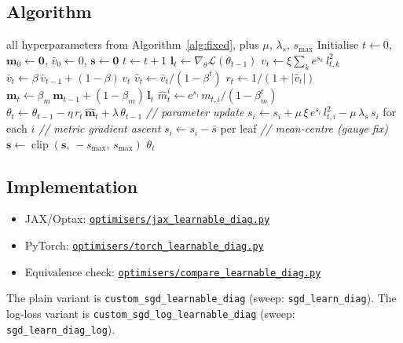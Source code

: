 \documentclass{article}
\newcommand{\loss}{\mathcal{L}}
\newcommand{\vecb}[1]{\boldsymbol{#1}}
\begin{document}
\subsection{Algorithm}

\begin{algorithm}[H]
\caption{Learnable diagonal metric (plain embedding)}
\label{alg:diag}
\begin{algorithmic}[1]
\REQUIRE all hyperparameters from Algorithm~\ref{alg:fixed},
plus $\mu$, $\lambda_s$, $s_{\max}$
\STATE Initialise $t \leftarrow 0$, $\vecb{m}_0 \leftarrow \vecb{0}$, $\bar{v}_0 \leftarrow 0$, $\vecb{s} \leftarrow \vecb{0}$
\STATE $t \leftarrow t + 1$
\STATE $\vecb{l}_t \leftarrow \nabla_\theta \loss(\theta_{t-1})$
\STATE $v_t \leftarrow \xi\sum_k e^{s_k}\,l_{t,k}^2$
\STATE $\bar{v}_t \leftarrow \beta\,\bar{v}_{t-1} + (1-\beta)\,v_t$
\STATE $\hat{v}_t \leftarrow \bar{v}_t / (1-\beta^t)$
\STATE $r_t \leftarrow 1/(1+|\hat{v}_t|)$
\STATE $\vecb{m}_t \leftarrow \beta_m\,\vecb{m}_{t-1} + (1-\beta_m)\,\vecb{l}_t$
\STATE $\hat{m}^i_t \leftarrow e^{s_i}\,m_{t,i}/(1-\beta_m^t)$
\STATE $\theta_t \leftarrow \theta_{t-1} - \eta\,r_t\,\hat{\vecb{m}}_t + \lambda\,\theta_{t-1}$
    \hfill{\footnotesize\textit{// parameter update}}
\STATE $s_i \leftarrow s_i + \mu\,\xi\,e^{s_i}\,l_{t,i}^2 - \mu\,\lambda_s\,s_i$ for each $i$
    \hfill{\footnotesize\textit{// metric gradient ascent}}
\STATE $s_i \leftarrow s_i - \bar{s}$ per leaf
    \hfill{\footnotesize\textit{// mean-centre (gauge fix)}}
\STATE $\vecb{s} \leftarrow \operatorname{clip}(\vecb{s},\,-s_{\max},\,s_{\max})$
\ENDWHILE
\RETURN $\theta_t$
\end{algorithmic}
\end{algorithm}

\subsection{Implementation}
\begin{itemize}
    \item JAX/Optax: \href{https://github.com/Noah-Everett/Induced-Metric-Optimiser/blob/main/optimisers/jax_learnable_diag.py}{\texttt{optimisers/jax\_learnable\_diag.py}}
    \item PyTorch: \href{https://github.com/Noah-Everett/Induced-Metric-Optimiser/blob/main/optimisers/torch_learnable_diag.py}{\texttt{optimisers/torch\_learnable\_diag.py}}
    \item Equivalence check: \href{https://github.com/Noah-Everett/Induced-Metric-Optimiser/blob/main/optimisers/compare_learnable_diag.py}{\texttt{optimisers/compare\_learnable\_diag.py}}
\end{itemize}
\begin{sloppypar}
The plain variant is \texttt{custom\_sgd\_learnable\_diag} (sweep: \texttt{sgd\_learn\_diag}).
The log-loss variant is \texttt{custom\_sgd\_log\_learnable\_diag} (sweep: \texttt{sgd\_learn\_diag\_log}).
\end{sloppypar}
\end{document}
